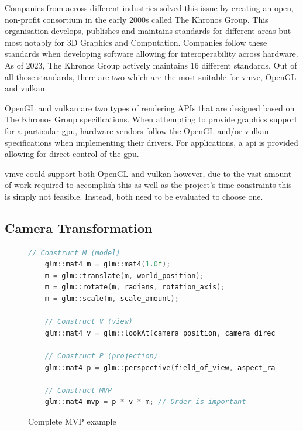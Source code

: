 \documentclass[11pt]{article}
\begin{document}
Companies from across different industries solved this issue by creating
an open, non-profit consortium in the early 2000s called The Khronos Group. This
organisation develops, publishes and maintains standards for different areas
but most notably for 3D Graphics and Computation. Companies follow these 
standards when developing software allowing for interoperability across
hardware. As of 2023, The Khronos Group actively maintains 16 different
standards. Out of all those standards, there are two which are the most
suitable for \gls*{vmve}, OpenGL and \gls*{vulkan}.

OpenGL and \gls*{vulkan} are two types of rendering APIs that are designed based on
The Khronos Group specifications. When attempting to provide graphics support
for a particular \gls*{gpu}, hardware vendors follow the OpenGL and/or \gls*{vulkan}
specifications when implementing their drivers. For applications, a
\gls*{api} is provided allowing for direct control of the \gls*{gpu}.

\gls*{vmve} could support both OpenGL and \gls*{vulkan} however, due to the vast
amount of work required to accomplish this as well as the project's time
constraints this is simply not feasible. Instead, both need to be evaluated to
choose one.


\subsection{Camera Transformation}
\begin{figure}[H]
  \centering
  \begin{lstlisting}[language=C++]
    // Construct M (model)
    glm::mat4 m = glm::mat4(1.0f);
    m = glm::translate(m, world_position);   
    m = glm::rotate(m, radians, rotation_axis); 
    m = glm::scale(m, scale_amount);

    // Construct V (view)
    glm::mat4 v = glm::lookAt(camera_position, camera_direction, camera_up);

    // Construct P (projection)
    glm::mat4 p = glm::perspective(field_of_view, aspect_ratio, near, far);

    // Construct MVP
    glm::mat4 mvp = p * v * m; // Order is important

  \end{lstlisting}
  \caption{Complete MVP example}
  \label{fig:local_to_world_appendix}
\end{figure}
\end{document}
